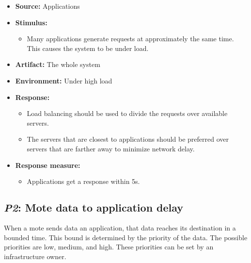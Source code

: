 \documentclass[english]{sareport}
\begin{document}
\begin{itemize}
    \item \textbf{Source:} Applications
    \item \textbf{Stimulus:}
        \begin{itemize}
            \item Many applications generate requests at approximately the same time.
                  This causes the system to be under load.
        \end{itemize}

    \item \textbf{Artifact:} The whole system
    \item \textbf{Environment:} Under high load
    \item \textbf{Response:}
        \begin{itemize}
            \item Load balancing should be used to divide the requests over
                  available servers.
            \item The servers that are closest to applications should be preferred
                  over servers that are farther away to minimize network delay.
        \end{itemize}

    \item \textbf{Response measure:}
        \begin{itemize}
            \item Applications get a response within 5s.
        \end{itemize}
\end{itemize}

\subsection{\emph{P2}: Mote data to application delay}
When a mote sends data an application, that data reaches its
destination in a bounded time. This bound is determined by the priority
of the data. The possible priorities are low, medium, and high.
These priorities can be set by an infrastructure owner.
\end{document}

